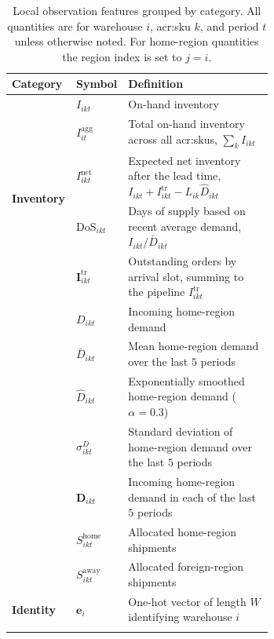 \begin{table}[tbp]
\centering
\small
\setlength{\tabcolsep}{6pt}
\renewcommand{\arraystretch}{1.3}
\caption[Observation feature]{Local observation features grouped by category. All quantities are for warehouse $i$, \gls{acr:sku} $k$, and period $t$ unless otherwise noted. For home-region quantities the region index is set to $j=i$.}
\label{tab:obs-features}
\begin{tabular}{@{}l l >{\raggedright\arraybackslash}m{0.66\linewidth}@{}}
\toprule
\textbf{Category} & \textbf{Symbol} & \textbf{Definition}\\
\midrule
\multirow{5}{*}{\textbf{Inventory}}
 & $I_{ikt}$ & On-hand inventory\\\addlinespace[1pt]
 & $I^{\mathrm{agg}}_{it}$ & Total on-hand inventory across all \glspl{acr:sku}, $\sum_{k} I_{ikt}$\\\addlinespace[1pt]
 & $I^{\mathrm{net}}_{ikt}$ & Expected net inventory after the lead time, $I_{ikt}+I^{\mathrm{tr}}_{ikt}-L_{ik}\hat{D}_{ikt}$\\\addlinespace[1pt]
 & $\mathrm{DoS}_{ikt}$ & Days of supply based on recent average demand, $I_{ikt}/\bar{D}_{ikt}$\\\addlinespace[1pt]
 & $\mathbf{I}^{\mathrm{tr}}_{ikt}$ & Outstanding orders by arrival slot, summing to the pipeline $I^{\mathrm{tr}}_{ikt}$\\\addlinespace[1pt]
\midrule
\multirow{5}{*}{\textbf{Demand}}
 & $D_{ikt}$ & Incoming home-region demand\\\addlinespace[1pt]
 & $\bar{D}_{ikt}$ & Mean home-region demand over the last $5$ periods\\\addlinespace[1pt]
 & $\hat{D}_{ikt}$ & Exponentially smoothed home-region demand ($\alpha=0.3$)\\\addlinespace[1pt]
 & $\sigma^{D}_{ikt}$ & Standard deviation of home-region demand over the last $5$ periods\\\addlinespace[1pt]
 & $\mathbf{D}_{ikt}$ & Incoming home-region demand in each of the last $5$ periods\\\addlinespace[1pt]
\midrule
\multirow{2}{*}{\textbf{Fulfillment}}
 & $S^{\mathrm{home}}_{ikt}$ & Allocated home-region shipments\\\addlinespace[1pt]
 & $S^{\mathrm{away}}_{ikt}$ & Allocated foreign-region shipments\\\addlinespace[1pt]
\midrule
\textbf{Identity}
 & $\mathbf{e}_{i}$ & One-hot vector of length $W$ identifying warehouse $i$\\\addlinespace[1pt]
\bottomrule
\end{tabular}
\end{table}

